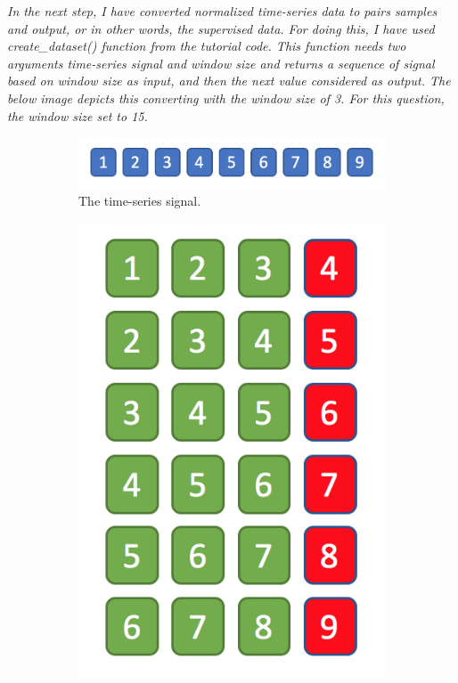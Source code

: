 \textit{In the next step, I have converted normalized time-series data to pairs samples and output, or in other words, the supervised data. For doing this, I have used create\_dataset() function from the tutorial code. This function needs two arguments time-series signal and window size and returns a sequence of signal based on window size as input, and then the next value considered as output. The below image depicts this converting with the window size of 3. For this question, the window size set to 15.}

\begin{figure}[H]
     \centering
     \begin{subfigure}[b]{0.55\textwidth}
         \centering
         \includegraphics[width=1\textwidth]{manuscript/src/figures/Ass4/time.png}
         \caption{The time-series signal.}
         \label{fig:ROC_all}
     \end{subfigure}
     \vfill
     \begin{subfigure}[b]{.25\textwidth}
         \centering
         \includegraphics[width=1\textwidth]{manuscript/src/figures/Ass4/sup.png}

\end{subfigure}
\end{figure}
